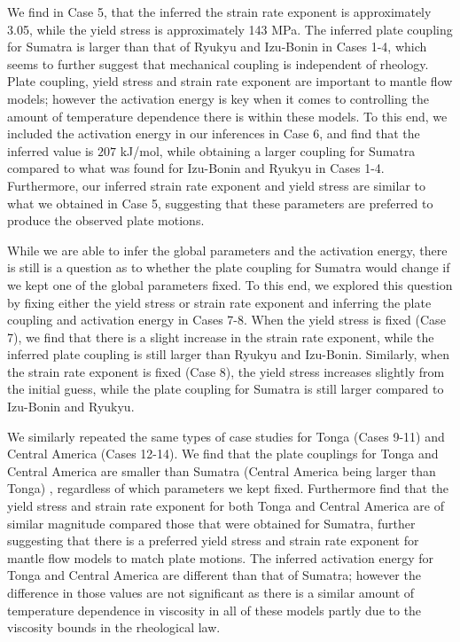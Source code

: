 \documentclass[12pt]{article}
\begin{document}
We find in Case 5, that the inferred the strain rate exponent is approximately 3.05, while the yield stress is approximately 143 MPa. The inferred plate coupling for Sumatra is larger than that of Ryukyu and Izu-Bonin in Cases 1-4, which seems to further suggest that mechanical coupling is independent of rheology. Plate coupling, yield stress and strain rate exponent are important to mantle flow models; however the activation energy is key when it comes to controlling the amount of temperature dependence there is within these models. To this end, we included the activation energy in our inferences in Case 6, and find that the inferred value is $207$ kJ/mol, while obtaining a larger coupling for Sumatra compared to what was found for Izu-Bonin and Ryukyu in  Cases 1-4. Furthermore, our inferred strain rate exponent and yield stress are similar to what we obtained in Case 5, suggesting that these parameters are preferred to produce the observed plate motions. 


While we are able to infer the global parameters and the activation energy, there is still is a question as to whether the plate coupling for Sumatra would change if we kept one of the global parameters fixed. To this end, we explored this question by fixing either the yield stress or strain rate exponent and inferring the plate coupling and activation energy in Cases 7-8. When the yield stress is fixed (Case 7), we find that there is a slight increase in the strain rate exponent, while the inferred plate coupling is still larger than Ryukyu and Izu-Bonin. Similarly, when the strain rate exponent is fixed (Case 8), the yield stress increases slightly from the initial guess, while the plate coupling for Sumatra is still larger compared to Izu-Bonin and Ryukyu. 

We similarly repeated the same types of case studies for Tonga (Cases 9-11) and Central America (Cases 12-14). We find that the plate couplings for Tonga and Central America are smaller than Sumatra (Central America being larger than Tonga) , regardless of which parameters we kept fixed. Furthermore find that the yield stress and strain rate exponent for both Tonga and Central America are of similar magnitude compared those that were obtained for Sumatra, further suggesting that there is a preferred yield stress and strain rate exponent for mantle flow models to match plate motions. The inferred activation energy for Tonga and Central America are different than that of Sumatra; however the difference in those values are not significant as there is a similar amount of temperature dependence in viscosity in all of these models partly due to the viscosity bounds in the rheological law.
\end{document}
